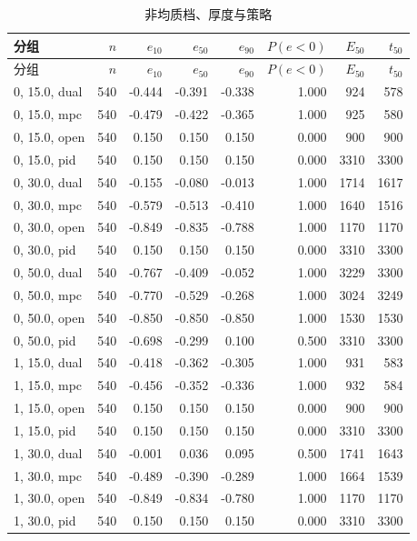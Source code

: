 \begin{longtable}{lrrrrrrr}
\caption{非均质档、厚度与策略}\\
\toprule
分组 & $n$ & $e_{10}$ & $e_{50}$ & $e_{90}$ & $P(e{<}0)$ & $E_{50}$ & $t_{50}$ \\
\midrule
\endfirsthead
\toprule
分组 & $n$ & $e_{10}$ & $e_{50}$ & $e_{90}$ & $P(e{<}0)$ & $E_{50}$ & $t_{50}$ \\
\midrule
\endhead
0, 15.0, dual & 540 & -0.444 & -0.391 & -0.338 & 1.000 & 924 & 578 \\
0, 15.0, mpc & 540 & -0.479 & -0.422 & -0.365 & 1.000 & 925 & 580 \\
0, 15.0, open & 540 & 0.150 & 0.150 & 0.150 & 0.000 & 900 & 900 \\
0, 15.0, pid & 540 & 0.150 & 0.150 & 0.150 & 0.000 & 3310 & 3300 \\
0, 30.0, dual & 540 & -0.155 & -0.080 & -0.013 & 1.000 & 1714 & 1617 \\
0, 30.0, mpc & 540 & -0.579 & -0.513 & -0.410 & 1.000 & 1640 & 1516 \\
0, 30.0, open & 540 & -0.849 & -0.835 & -0.788 & 1.000 & 1170 & 1170 \\
0, 30.0, pid & 540 & 0.150 & 0.150 & 0.150 & 0.000 & 3310 & 3300 \\
0, 50.0, dual & 540 & -0.767 & -0.409 & -0.052 & 1.000 & 3229 & 3300 \\
0, 50.0, mpc & 540 & -0.770 & -0.529 & -0.268 & 1.000 & 3024 & 3249 \\
0, 50.0, open & 540 & -0.850 & -0.850 & -0.850 & 1.000 & 1530 & 1530 \\
0, 50.0, pid & 540 & -0.698 & -0.299 & 0.100 & 0.500 & 3310 & 3300 \\
1, 15.0, dual & 540 & -0.418 & -0.362 & -0.305 & 1.000 & 931 & 583 \\
1, 15.0, mpc & 540 & -0.456 & -0.352 & -0.336 & 1.000 & 932 & 584 \\
1, 15.0, open & 540 & 0.150 & 0.150 & 0.150 & 0.000 & 900 & 900 \\
1, 15.0, pid & 540 & 0.150 & 0.150 & 0.150 & 0.000 & 3310 & 3300 \\
1, 30.0, dual & 540 & -0.001 & 0.036 & 0.095 & 0.500 & 1741 & 1643 \\
1, 30.0, mpc & 540 & -0.489 & -0.390 & -0.289 & 1.000 & 1664 & 1539 \\
1, 30.0, open & 540 & -0.849 & -0.834 & -0.780 & 1.000 & 1170 & 1170 \\
1, 30.0, pid & 540 & 0.150 & 0.150 & 0.150 & 0.000 & 3310 & 3300 \\

\end{longtable}
